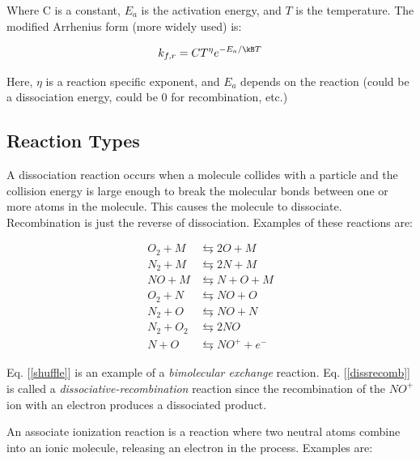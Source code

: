 \documentclass[10pt]{article}
\begin{document}
\begin{flushleft}
Where C is a constant, $E_a$ is the activation energy, and $T$ is the temperature. The modified Arrhenius form (more widely used) is:

\begin{equation}
    k_{f,r} = C T^\eta e^{-E_a/ \kB T}
\end{equation}

Here, $\eta$ is a reaction specific exponent, and $E_a$ depends on the reaction (could be a dissociation energy, could be 0 for recombination, etc.)


\subsection{Reaction Types}

\begin{definition}

    A dissociation reaction occurs when a molecule collides with a particle and the collision energy is large enough to break the molecular bonds between one or more atoms in the molecule. This causes the molecule to dissociate. Recombination is just the reverse of dissociation. Examples of these reactions are:

    \begin{subequations}
    \begin{align}
        O_2 + M &\leftrightarrows 2O + M
        \\ N_2 + M &\leftrightarrows 2N + M
        \\ NO + M &\leftrightarrows N + O + M
        \\ O_2 + N &\leftrightarrows NO + O 
        \label{shuffle}
        \\ N_2 + O &\leftrightarrows NO + N
        \\ N_2 + O_2 &\leftrightarrows 2NO
        \\ N + O &\leftrightarrows NO^+ + e^- 
        \label{dissrecomb}
    \end{align}
    \end{subequations}

    Eq. [\ref{shuffle}] is an example of a \textit{bimolecular exchange} reaction. Eq. [\ref{dissrecomb}] is called a \textit{dissociative-recombination}  reaction since the recombination of the $NO^+$ ion with an electron produces a dissociated product.
    
\end{definition}

\begin{definition}
    An associate ionization reaction is a reaction where two neutral atoms combine into an ionic molecule, releasing an electron in the process. Examples are:


\end{definition}
\end{flushleft}
\end{document}

